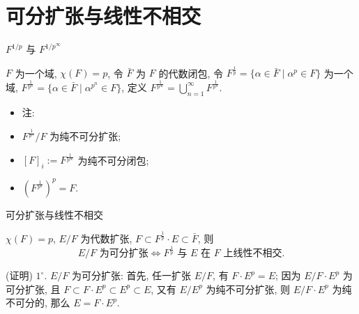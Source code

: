 
\section[可分]{可分扩张与线性不相交}


\begin{frame}{$F^{1/p}$ 与 $F^{1/p^{\infty}}$}

$F$ 为一个域, $\chi(F) = p$, 令 $\bar{F}$ 为 $F$ 的代数闭包,
令 $F^{\frac{1}{p}} = \{ \alpha \in \bar{F} \mid \alpha^p \in F \}$ 为一个域,
$F^{\frac{1}{p^n}} = \{ \alpha \in \bar{F} \mid \alpha^{p^n} \in F \}$,
定义 $F^{\frac{1}{p^{\infty}}} = \bigcup_{n=1}^{\infty} F^{\frac{1}{p^n}}$.

\pause

\begin{itemize}
\item 注:
\item {} $F^{\frac{1}{p^n}}/F$ 为纯不可分扩张;
\item {} $[F]_i := F^{\frac{1}{p^{\infty}}}$ 为纯不可分闭包;
\item {} $(F^{\frac{1}{p^n}})^p = F$.
\end{itemize}

\end{frame}


\begin{frame}{可分扩张与线性不相交}

\begin{lem}[可分扩张与线性不相交]
$\chi(F) = p$, $E/F$ 为代数扩张, $F \subset F^{\frac{1}{p}} \cdot E \subset \bar{F}$, 则
\[
E/F \text{ 为可分扩张} \iff F^{\frac{1}{p}} \text{ 与 } E \text{ 在 } F \text{ 上线性不相交}.
\]
\end{lem}

\startproof[bg=yellow, fg=red](证明)
$1^{\circ}$. $E/F$ 为可分扩张:
首先,  任一扩张 $E/F$, 有 $F \cdot E^p = E$;
因为 $E/F \cdot E^p$ 为可分扩张, 且 $F \subset F \cdot E^p \subset E^p \subset E$,
又有 $E/E^p$ 为纯不可分扩张, 则 $E/F \cdot E^p$ 为纯不可分的,
那么 $E = F \cdot E^p$.

\end{frame}


